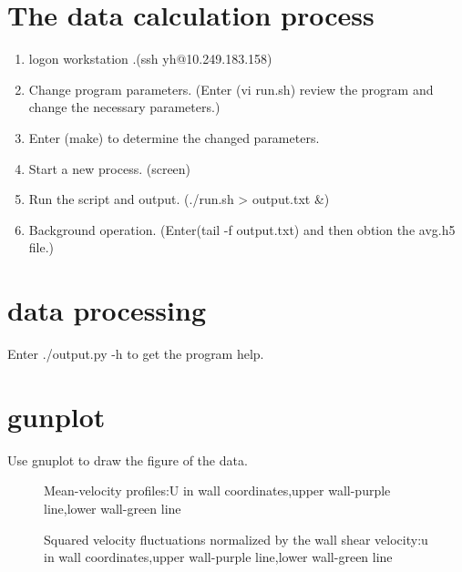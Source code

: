 \section{The data calculation process}
\begin{enumerate}
    \item logon workstation .(ssh yh@10.249.183.158)
    \item Change program parameters. (Enter (vi run.sh) review the program and change the necessary parameters.)
    \item Enter (make) to determine the changed parameters. 
    \item Start a new process. (screen)
    \item Run the script and output. (./run.sh > output.txt  \&)
    \item Background operation. (Enter(tail -f output.txt) and then obtion the avg.h5 file.) 
\end{enumerate}

\section{data processing}
Enter ./output.py -h to get the program help.

\section{gunplot}
Use gnuplot to draw the figure of the data.
\begin{figure}[htbp]
\centering
 \caption{Mean-velocity profiles:U in wall coordinates,upper wall-purple line,lower wall-green line}
\label{pd}
\end{figure}

\begin{figure}[H]
\centering
 \caption{Squared velocity fluctuations normalized by the wall shear velocity:u in wall coordinates,upper wall-purple line,lower wall-green line}
\label{pd}
\end{figure}

